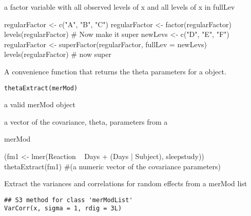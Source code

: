 \documentclass[letterpaper]{book}
\begin{document}
%
\begin{Value}
a factor variable with all observed levels of x and all levels
of x in fullLev
\end{Value}
%
\begin{Examples}
\begin{ExampleCode}
regularFactor <- c("A", "B", "C")
regularFactor <- factor(regularFactor)
levels(regularFactor)
# Now make it super
newLevs <- c("D", "E", "F")
regularFactor <- superFactor(regularFactor, fullLev = newLevs)
levels(regularFactor) # now super
\end{ExampleCode}
\end{Examples}
%
\begin{Description}\relax
A convenience function that returns the theta parameters for a
 object.
\end{Description}
%
\begin{Usage}
\begin{verbatim}
thetaExtract(merMod)
\end{verbatim}
\end{Usage}
%
\begin{Arguments}
\begin{ldescription}
\item[\code{merMod}] a valid merMod object
\end{ldescription}
\end{Arguments}
%
\begin{Value}
a vector of the covariance, theta, parameters from a 
\end{Value}
%
\begin{SeeAlso}\relax
merMod
\end{SeeAlso}
%
\begin{Examples}
\begin{ExampleCode}
(fm1 <- lmer(Reaction ~ Days + (Days | Subject), sleepstudy))
thetaExtract(fm1) #(a numeric vector of the covariance parameters)
\end{ExampleCode}
\end{Examples}
%
\begin{Description}\relax
Extract the variances and correlations for random effects from a merMod list
\end{Description}
%
\begin{Usage}
\begin{verbatim}
## S3 method for class 'merModList'
VarCorr(x, sigma = 1, rdig = 3L)
\end{verbatim}
\end{Usage}
\end{document}
